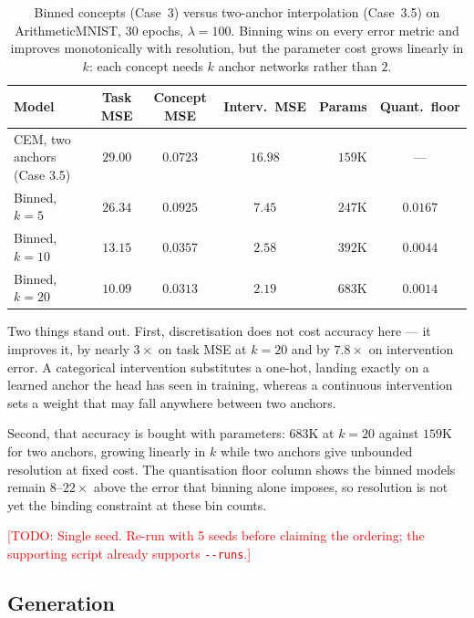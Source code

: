 \documentclass[11pt]{article}
\newcommand{\todo}[1]{\textcolor{red}{[TODO: #1]}}
\begin{document}
\begin{table}[t]
\centering
\caption{Binned concepts (Case~3) versus two-anchor interpolation (Case~3.5) on
ArithmeticMNIST, 30 epochs, $\lambda = 100$. Binning wins on every error metric
and improves monotonically with resolution, but the parameter cost grows
linearly in $k$: each concept needs $k$ anchor networks rather than $2$.}
\label{tab:binned}
\begin{tabular}{lcccrc}
\toprule
\textbf{Model} & \textbf{Task MSE} & \textbf{Concept MSE} &
\textbf{Interv.\ MSE} & \textbf{Params} & \textbf{Quant.\ floor} \\
\midrule
CEM, two anchors (Case 3.5) & $29.00$ & $0.0723$ & $16.98$ & $159$K & --- \\
\midrule
Binned, $k=5$   & $26.34$ & $0.0925$ & $7.45$ & $247$K & $0.0167$ \\
Binned, $k=10$  & $13.15$ & $0.0357$ & $2.58$ & $392$K & $0.0044$ \\
Binned, $k=20$  & $\mathbf{10.09}$ & $\mathbf{0.0313}$ & $\mathbf{2.19}$ &
                  $683$K & $0.0014$ \\
\bottomrule
\end{tabular}
\end{table}

Two things stand out. First, discretisation does not cost accuracy here --- it
improves it, by nearly $3\times$ on task MSE at $k=20$ and by $7.8\times$ on
intervention error. A categorical intervention substitutes a one-hot, landing
exactly on a learned anchor the head has seen in training, whereas a continuous
intervention sets a weight that may fall anywhere between two anchors.

Second, that accuracy is bought with parameters: $683$K at $k=20$ against
$159$K for two anchors, growing linearly in $k$ while two anchors give
unbounded resolution at fixed cost. The quantisation floor column shows the
binned models remain $8$--$22\times$ above the error that binning alone
imposes, so resolution is not yet the binding constraint at these bin counts.

\todo{Single seed. Re-run with 5 seeds before claiming the ordering; the
supporting script already supports \texttt{-{}-runs}.}

\subsection{Generation}
\end{document}
